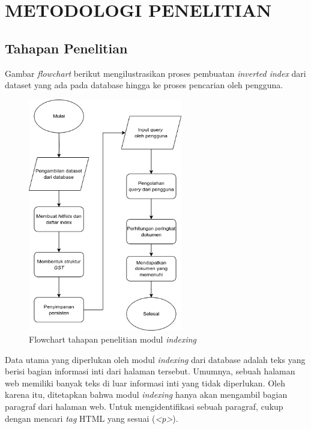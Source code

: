 

\chapter{METODOLOGI PENELITIAN}

\section{Tahapan Penelitian}

Gambar \textit{flowchart} berikut mengilustrasikan proses pembuatan \textit{
inverted index} dari dataset yang ada pada database hingga ke proses pencarian
oleh pengguna.

\begin{figure}[H]
  \centering{}
	\includegraphics[width=0.6\textwidth]{gambar/flowchart_awal}
  \caption{Flowchart tahapan penelitian modul \textit{indexing}}
\end{figure}

Data utama yang diperlukan oleh modul \textit{indexing} dari database adalah
teks yang berisi bagian informasi inti dari halaman tersebut. Umumnya, sebuah
halaman web memiliki banyak teks di luar informasi inti yang tidak diperlukan.
Oleh karena itu, ditetapkan bahwa modul \textit{indexing} hanya akan mengambil
bagian paragraf dari halaman web. Untuk mengidentifikasi sebuah paragraf, cukup
dengan mencari \textit{tag} HTML yang sesuai (\textit{<p>}).

